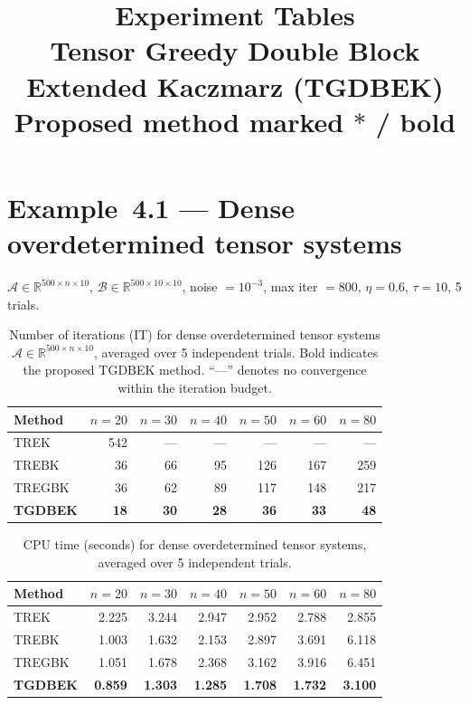 \documentclass[11pt,a4paper]{article}
\title{\textbf{Experiment Tables}\\
\large Tensor Greedy Double Block Extended Kaczmarz (TGDBEK)\\
\normalsize Proposed method marked $*$ / bold}
\date{}
\begin{document}
\maketitle
\thispagestyle{empty}

\section*{Example~4.1 — Dense overdetermined tensor systems}
$\mathcal{A}\in\mathbb{R}^{500\times n\times 10}$, $\mathcal{B}\in\mathbb{R}^{500\times 10\times 10}$, noise $=10^{-3}$, max iter $=800$, $\eta=0.6$, $\tau=10$, 5 trials.

\begin{table}[ht]
\centering
\caption{Number of iterations (IT) for dense overdetermined tensor systems $\mathcal{A}\in\mathbb{R}^{500\times n\times 10}$, averaged over 5 independent trials. Bold indicates the proposed TGDBEK method. ``---'' denotes no convergence within the iteration budget.}
\label{tab:dense-it}
\begin{tabular}{lrrrrrr}
\toprule
Method & $n=20$ & $n=30$ & $n=40$ & $n=50$ & $n=60$ & $n=80$ \\
\midrule
TREK & 542 & --- & --- & --- & --- & --- \\
TREBK & 36 & 66 & 95 & 126 & 167 & 259 \\
TREGBK & 36 & 62 & 89 & 117 & 148 & 217 \\
\textbf{TGDBEK} & \textbf{18} & \textbf{30} & \textbf{28} & \textbf{36} & \textbf{33} & \textbf{48} \\
\bottomrule
\end{tabular}
\end{table}

\begin{table}[ht]
\centering
\caption{CPU time (seconds) for dense overdetermined tensor systems, averaged over 5 independent trials.}
\label{tab:dense-cpu}
\begin{tabular}{lrrrrrr}
\toprule
Method & $n=20$ & $n=30$ & $n=40$ & $n=50$ & $n=60$ & $n=80$ \\
\midrule
TREK & 2.225 & 3.244 & 2.947 & 2.952 & 2.788 & 2.855 \\
TREBK & 1.003 & 1.632 & 2.153 & 2.897 & 3.691 & 6.118 \\
TREGBK & 1.051 & 1.678 & 2.368 & 3.162 & 3.916 & 6.451 \\
\textbf{TGDBEK} & \textbf{0.859} & \textbf{1.303} & \textbf{1.285} & \textbf{1.708} & \textbf{1.732} & \textbf{3.100} \\
\bottomrule
\end{tabular}
\end{table}
\end{document}
